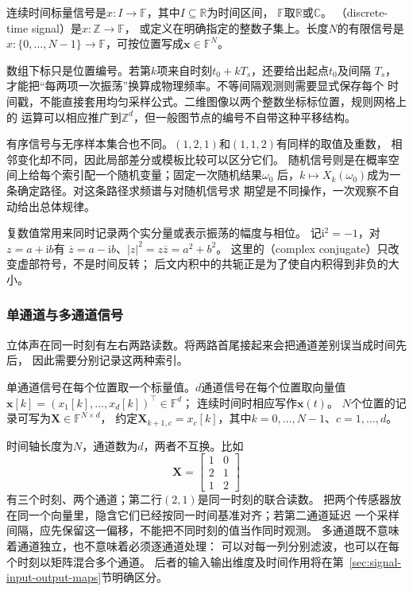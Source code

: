 \begin{definition}[信号的索引类型]
  \label{def:signal-index-types}
  连续时间标量信号是$x:I\to\mathbb F$，其中$I\subseteq\mathbb R$为时间区间，
  $\mathbb F$取$\mathbb R$或$\mathbb C$。
  （discrete-time signal）是$x:\mathbb Z\to\mathbb F$，
  或定义在明确指定的整数子集上。长度$N$的有限信号是
  $x:\{0,\ldots,N-1\}\to\mathbb F$，可按位置写成$\bm x\in\mathbb F^N$。
\end{definition}

数组下标只是位置编号。若第$k$项来自时刻$t_0+kT_s$，还要给出起点$t_0$及间隔
$T_s$，才能把“每两项一次振荡”换算成物理频率。不等间隔观测则需要显式保存每个
时间戳，不能直接套用均匀采样公式。二维图像以两个整数坐标标位置，规则网格上的
运算可以相应推广到$\mathbb Z^d$，但一般图节点的编号不自带这种平移结构。

有序信号与无序样本集合也不同。$(1,2,1)$和$(1,1,2)$有同样的取值及重数，
相邻变化却不同，因此局部差分或模板比较可以区分它们。
随机信号则是在概率空间上给每个索引配一个随机变量；固定一次随机结果$\omega_0$
后，$k\mapsto X_k(\omega_0)$成为一条确定路径。对这条路径求频谱与对随机信号求
期望是不同操作，一次观察不自动给出总体规律。

复数值常用来同时记录两个实分量或表示振荡的幅度与相位。
记$\mathrm i^2=-1$，对$z=a+\mathrm ib$有
$\overline z=a-\mathrm ib$、$|z|^2=z\overline z=a^2+b^2$。
这里的（complex conjugate）只改变虚部符号，不是时间反转；
后文内积中的共轭正是为了使自内积得到非负的大小。

\subsubsection{单通道与多通道信号}

立体声在同一时刻有左右两路读数。将两路首尾接起来会把通道差别误当成时间先后，
因此需要分别记录这两种索引。
\begin{definition}[标量信号与向量值信号]
  \label{def:signal-multichannel}
  单通道信号在每个位置取一个标量值。$d$通道信号在每个位置取向量值
  $\bm x[k]=(x_1[k],\ldots,x_d[k])^\top\in\mathbb F^d$；
  连续时间时相应写作$\bm x(t)$。
  $N$个位置的记录可写为$\bm X\in\mathbb F^{N\times d}$，
  约定$\bm X_{k+1,c}=x_c[k]$，其中$k=0,\ldots,N-1$、$c=1,\ldots,d$。
\end{definition}

时间轴长度为$N$，通道数为$d$，两者不互换。比如
\begin{equation}
  \bm X=
  \begin{bmatrix}1&0\\2&1\\1&2\end{bmatrix}
  \label{eq:signal-multichannel-record}
\end{equation}
有三个时刻、两个通道；第二行$(2,1)$是同一时刻的联合读数。
把两个传感器放在同一个向量里，隐含它们已经按同一时间基准对齐；若第二通道延迟
一个采样间隔，应先保留这一偏移，不能把不同时刻的值当作同时观测。
多通道既不意味着通道独立，也不意味着必须逐通道处理：
可以对每一列分别滤波，也可以在每个时刻以矩阵混合多个通道。
后者的输入输出维度及时间作用将在第~\ref{sec:signal-input-output-maps}节明确区分。

